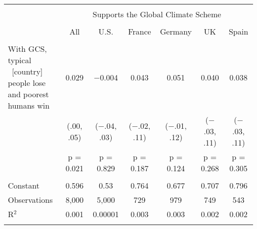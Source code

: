 
\begin{tabular}{@{\extracolsep{5pt}}lcccccc} 
\\[-1.8ex]\hline 
\hline \\[-1.8ex] 
 & \multicolumn{6}{c}{Supports the Global Climate Scheme} \\ 
\cline{2-7} 
\\[-1.8ex] & All & U.S. & France & Germany & UK & Spain \\ 
\hline \\[-1.8ex] 
 \makecell{With GCS, typical\\~[country] people lose\\and poorest humans win} & 0.029 & $-$0.004 & 0.043 & 0.051 & 0.040 & 0.038 \\ 
  & (.00, .05) & ($-$.04, .03) & ($-$.02, .11) & ($-$.01, .12) & ($-$.03, .11) & ($-$.03, .11) \\ 
  & p = 0.021 & p = 0.829 & p = 0.187 & p = 0.124 & p = 0.268 & p = 0.305 \\ 
 \hline \\[-1.8ex] 
Constant & 0.596 & 0.53 & 0.764 & 0.677 & 0.707 & 0.796 \\ 
Observations & 8,000 & 5,000 & 729 & 979 & 749 & 543 \\ 
R$^{2}$ & 0.001 & 0.00001 & 0.003 & 0.003 & 0.002 & 0.002 \\ 
\hline 
\hline \\[-1.8ex] 
\end{tabular} 